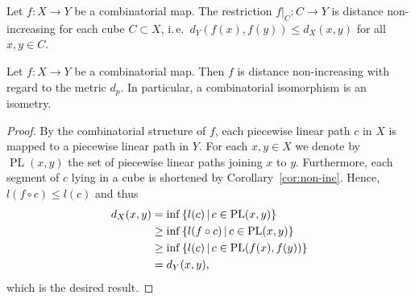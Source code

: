 \begin{cor}
  \label{cor:non-inc}
  Let \(f\colon X \to Y\) be a combinatorial map. The restriction \(f|_C\colon C \to Y\) is distance non-increasing for each cube \(C \subset X\), i.\,e.\ \(d_Y(f(x), f(y)) \leq d_X(x,y)\) for all \(x,y \in C\).
\end{cor}

\begin{prop}
  \label{prop:non-inc}
  Let \(f\colon X \to Y\) be a combinatorial map. Then \(f\) is distance non-increasing with regard to the metric \(d_p\). In particular, a combinatorial isomorphism is an isometry.
\end{prop}

\begin{proof}
  By the combinatorial structure of \(f\), each piecewise linear path \(c\) in \(X\) is mapped to a piecewise linear path in \(Y\). For each \(x,y \in X\) we denote by \(\operatorname{PL}(x,y)\) the set of piecewise linear paths joining \(x\) to \(y\). Furthermore, each segment of \(c\) lying in a cube is shortened by Corollary~\ref{cor:non-inc}. Hence, \(l(f \circ c) \leq l(c)\) and thus
  \begin{align*}
    d_X(x,y)
    & = \inf\left\{l(c) \,\middle|\, c \in \operatorname{PL}(x,y)\right\}\\
    & \geq \inf\left\{l(f \circ c) \,\middle|\, c \in \operatorname{PL}(x,y)\right\}\\
    & \geq \inf\left\{l(c) \,\middle|\, c \in \operatorname{PL}(f(x), f(y))\right\}\\
    & = d_Y(x,y),
  \end{align*}
  which is the desired result.
\end{proof}


